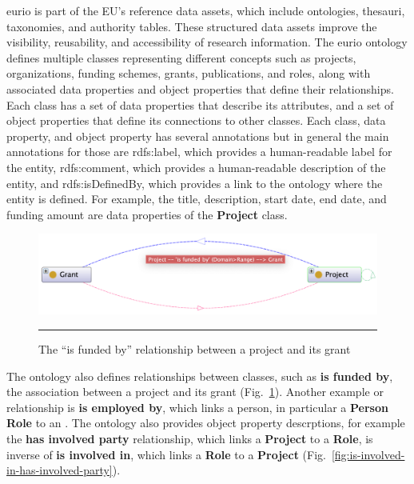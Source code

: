 \gls{eurio} is part of the EU's reference data assets, which include ontologies, thesauri, taxonomies, and authority tables.
These structured data assets improve the visibility, reusability, and accessibility of research information.
The \gls{eurio} ontology defines multiple classes representing different concepts such as projects, organizations, funding schemes, grants, publications, and roles, along with associated data properties and object properties that define their relationships.
Each class has a set of data properties that describe its attributes, and a set of object properties that define its connections to other classes.
Each class, data property, and object property has several annotations but in general the main annotations for those are rdfs:label, which provides a human-readable label for the entity, rdfs:comment, which provides a human-readable description of the entity, and rdfs:isDefinedBy, which provides a link to the ontology where the entity is defined.
For example, the title, description, start date, end date, and funding amount are data properties of the \textbf{Project} class.

\begin{figure}[htbp]
    \centering
 \includegraphics[width=\textwidth]{figures/data-analysis/is-funded-by.png}
     \rule{35em}{0.5pt}
    \caption{The ``is funded by'' relationship between a project and its grant}
 \label{fig:is-funded-by}
\end{figure}

The ontology also defines relationships between classes, such as \textbf{is funded by}, the association between a project and its grant (Fig.~\ref{fig:is-funded-by}).
Another example or relationship is \textbf{is employed by}, which links a person, in particular a \textbf{Person Role} to an .
The ontology also provides object property descrptions, for example the \textbf{has involved party} relationship, which links a \textbf{Project} to a \textbf{Role}, is inverse of \textbf{is involved in}, which links a \textbf{Role} to a \textbf{Project} (Fig.~\ref{fig:is-involved-in-has-involved-party}).

